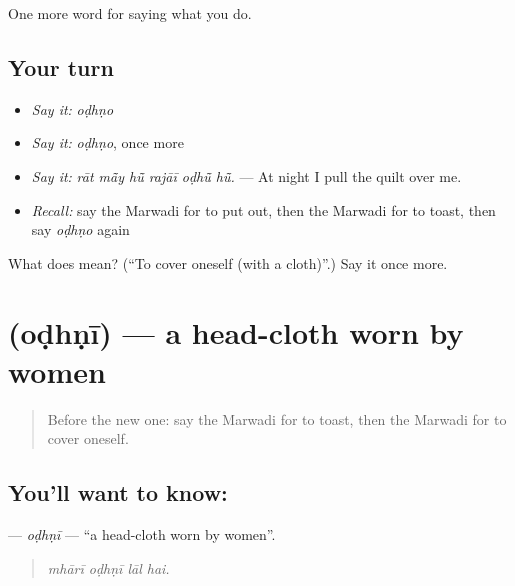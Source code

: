 \begin{grammarlens}[title={What you've built}]
One more word for saying what you do.
\end{grammarlens}

\subsection*{Your turn}
\begin{itemize}
\raggedright
  \item \emph{Say it:} \emph{oḍhṇo}
  \item \emph{Say it:} \emph{oḍhṇo}, once more
  \item \emph{Say it:} \emph{rāt mā̃y hū̃ rajāī oḍhū̃ hū̃.} — At night I pull the quilt over me.
  \item \emph{Recall:} say the Marwadi for to put out, then the Marwadi for to toast, then say \emph{oḍhṇo} again
\end{itemize}

\begin{tcolorbox}[breakable,colback=teal!4,colframe=teal!35!black,title={Before you move on}]
What does  mean? (\textquotedblleft{}To cover oneself (with a cloth)\textquotedblright{}.) Say it once more.
\end{tcolorbox}
\section[\texorpdfstring{\mw{ओढणी} (oḍhṇī)}{ओढणी (oḍhṇī)}]{ (oḍhṇī) — a head-cloth worn by women}

\label{lesson:MW-C174-odhni}



\begin{quote}
Before the new one: say the Marwadi for to toast, then the Marwadi for to cover oneself.
\end{quote}

\subsection*{You'll want to know: }
\textbf{} — \emph{oḍhṇī} — \textquotedblleft{}a head-cloth worn by women\textquotedblright{}.

\begin{quote}
   
\end{quote}

\begin{quote}
\emph{mhārī oḍhṇī lāl hai.}
\end{quote}


